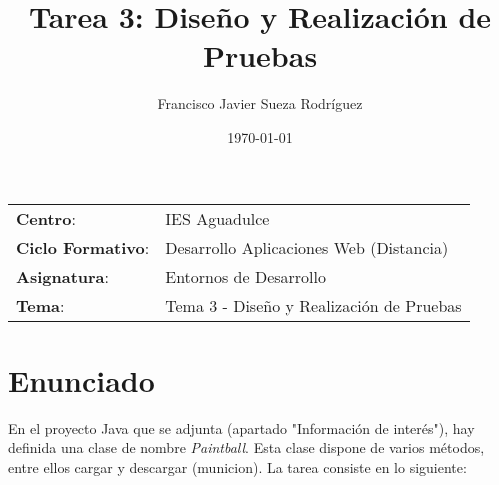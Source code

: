 


\title{
    \vspace{10ex}
    \normalfont \normalsize
    \huge \textbf{Tarea 3: Diseño y Realización de Pruebas}
}
\author{Francisco Javier Sueza Rodríguez}
\date{\normalsize\today}



\maketitle

\thispagestyle{empty}

\vspace{75ex}

\begin{center}
    \begin{tabular}{l l}
        \textbf{Centro}: & IES Aguadulce \\
        \textbf{Ciclo Formativo}: & Desarrollo Aplicaciones Web (Distancia)\\
        \textbf{Asignatura}: & Entornos de Desarrollo\\
       \textbf{Tema}: & Tema 3 - Diseño y Realización de Pruebas\\
    \end{tabular}
\end{center}

\newpage

\section{Enunciado}
En el proyecto Java que se adjunta (apartado "Información de interés"), hay definida una clase de nombre \textit{Paintball}. Esta clase dispone de varios métodos, entre ellos cargar y descargar (municion). La tarea consiste en lo siguiente:

